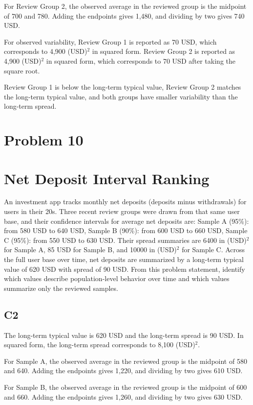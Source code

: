 \begin{ExamProblems}
		For Review Group 2, the observed average in the reviewed group is the midpoint of 700 and 780.
		Adding the endpoints gives 1,480, and dividing by two gives 740 USD.

		For observed variability, Review Group 1 is reported as 70 USD, which corresponds to 4,900 (USD)$^2$ in squared form.
		Review Group 2 is reported as 4,900 (USD)$^2$ in squared form, which corresponds to 70 USD after taking the square root.

		Review Group 1 is below the long-term typical value, Review Group 2 matches the long-term typical value, and both groups have smaller variability than the long-term spread.


		\newpage
		\item
		\section{Problem 10}
		\section{Net Deposit Interval Ranking}
		An investment app tracks monthly net deposits (deposits minus withdrawals) for users in their 20s.
		Three recent review groups were drawn from that same user base, and their confidence intervals for average net deposits are:
		Sample A (95\%): from 580 USD to 640 USD,
		Sample B (90\%): from 600 USD to 660 USD,
		Sample C (95\%): from 550 USD to 630 USD.
		Their spread summaries are 6400 in (USD)$^2$ for Sample A, 85 USD for Sample B, and 10000 in (USD)$^2$ for Sample C.
		Across the full user base over time, net deposits are summarized by a long-term typical value of 620 USD with spread of 90 USD.
		From this problem statement, identify which values describe population-level behavior over time and which values summarize only the reviewed samples.

\subsection*{C2}
		The long-term typical value is 620 USD and the long-term spread is 90 USD.
		In squared form, the long-term spread corresponds to 8,100 (USD)$^2$.

		For Sample A, the observed average in the reviewed group is the midpoint of 580 and 640.
		Adding the endpoints gives 1,220, and dividing by two gives 610 USD.

		For Sample B, the observed average in the reviewed group is the midpoint of 600 and 660.
		Adding the endpoints gives 1,260, and dividing by two gives 630 USD.


\end{ExamProblems}
